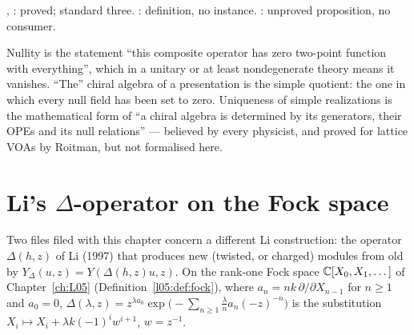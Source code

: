 \begin{status}
\allowbreak{}\allowbreak{}\allowbreak{}, \allowbreak{}\allowbreak{}\allowbreak{}: proved; standard three. : definition, no
instance. \allowbreak{}\allowbreak{}: unproved proposition, no consumer.
\end{status}

\begin{physics}
Nullity is the statement ``this composite operator has zero two-point function with everything'', which in a unitary or at least
nondegenerate theory means it vanishes. ``The'' chiral algebra of a presentation is the simple quotient: the one in which every null
field has been set to zero. Uniqueness of simple realizations is the mathematical form of ``a chiral algebra is determined by its
generators, their OPEs and its null relations'' --- believed by every physicist, and proved for lattice VOAs by Roitman, but not
formalised here.
\end{physics}

\section{Li's \texorpdfstring{$\Delta$}{Delta}-operator on the Fock space}\label{l11:sec:lidelta}

Two files filed with this chapter concern a different Li construction: the operator $\Delta(h,z)$ of Li (1997) that produces new
(twisted, or charged) modules from old by $Y_\Delta(u,z) = Y(\Delta(h,z)u,z)$. On the rank-one Fock space ${\mathbb{C}}[X_0,X_1,\dots]$ of
Chapter~\ref{ch:L05} (Definition~\ref{l05:def:fock}), where $a_n = nk\,\partial/\partial X_{n-1}$ for $n\ge1$ and $a_0 = 0$,
$\Delta(\lambda,z) = z^{\lambda a_0}\exp\bigl(-\sum_{n\ge1}\frac\lambda na_n(-z)^{-n}\bigr)$ is the substitution
$X_i\mapsto X_i+\lambda k(-1)^iw^{i+1}$, $w = z^{-1}$.

